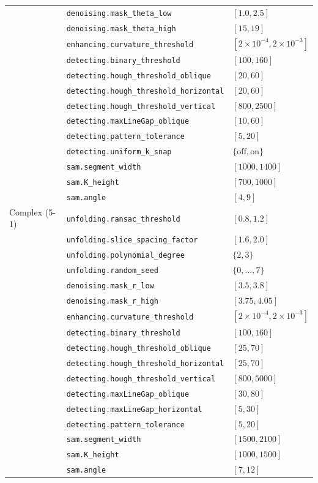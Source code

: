 \documentclass[a4paper,fleqn]{cas-dc}
\begin{document}
\begin{table}[t]
{\begin{tabular*}{\textwidth}{@{\extracolsep{\fill}} llp{} @{}}
 & \texttt{denoising.mask\_theta\_low} & $[1.0,2.5]$ \\
 & \texttt{denoising.mask\_theta\_high} & $[15,19]$ \\
 & \texttt{enhancing.curvature\_threshold} & $[2{\times}10^{-4},2{\times}10^{-3}]$ \\
 & \texttt{detecting.binary\_threshold} & $[100,160]$ \\
 & \texttt{detecting.hough\_threshold\_oblique} & $[20,60]$ \\
 & \texttt{detecting.hough\_threshold\_horizontal} & $[20,60]$ \\
 & \texttt{detecting.hough\_threshold\_vertical} & $[800,2500]$ \\
 & \texttt{detecting.maxLineGap\_oblique} & $[10,60]$ \\
 & \texttt{detecting.pattern\_tolerance} & $[5,20]$ \\
 & \texttt{detecting.uniform\_k\_snap} & $\{\mathrm{off},\mathrm{on}\}$ \\
 & \texttt{sam.segment\_width} & $[1000,1400]$ \\
 & \texttt{sam.K\_height} & $[700,1000]$ \\
 & \texttt{sam.angle} & $[4,9]$ \\
\addlinespace
Complex (5-1) & \texttt{unfolding.ransac\_threshold} & $[0.8,1.2]$ \\
 & \texttt{unfolding.slice\_spacing\_factor} & $[1.6,2.0]$ \\
 & \texttt{unfolding.polynomial\_degree} & $\{2,3\}$ \\
 & \texttt{unfolding.random\_seed} & $\{0,\ldots,7\}$ \\
 & \texttt{denoising.mask\_r\_low} & $[3.5,3.8]$ \\
 & \texttt{denoising.mask\_r\_high} & $[3.75,4.05]$ \\
 & \texttt{enhancing.curvature\_threshold} & $[2{\times}10^{-4},2{\times}10^{-3}]$ \\
 & \texttt{detecting.binary\_threshold} & $[100,160]$ \\
 & \texttt{detecting.hough\_threshold\_oblique} & $[25,70]$ \\
 & \texttt{detecting.hough\_threshold\_horizontal} & $[25,70]$ \\
 & \texttt{detecting.hough\_threshold\_vertical} & $[800,5000]$ \\
 & \texttt{detecting.maxLineGap\_oblique} & $[30,80]$ \\
 & \texttt{detecting.maxLineGap\_horizontal} & $[5,30]$ \\
 & \texttt{detecting.pattern\_tolerance} & $[5,20]$ \\
 & \texttt{sam.segment\_width} & $[1500,2100]$ \\
 & \texttt{sam.K\_height} & $[1000,1500]$ \\
 & \texttt{sam.angle} & $[7,12]$ \\
\bottomrule
\end{tabular*}}
\end{table}
\end{document}
